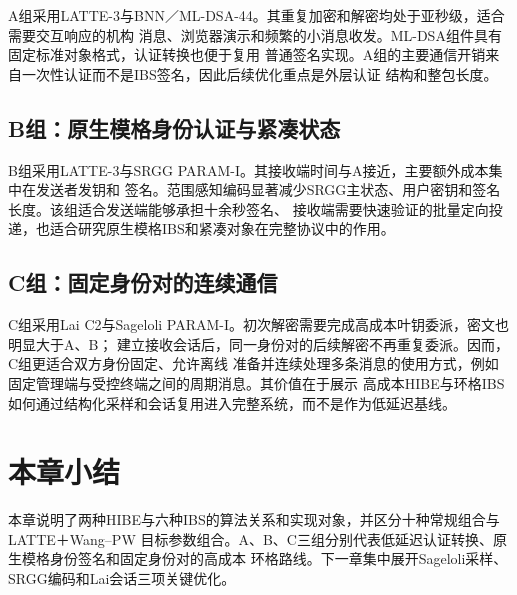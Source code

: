 A组采用LATTE-3与BNN／ML-DSA-44。其重复加密和解密均处于亚秒级，适合需要交互响应的机构
消息、浏览器演示和频繁的小消息收发。ML-DSA组件具有固定标准对象格式，认证转换也便于复用
普通签名实现。A组的主要通信开销来自一次性认证而不是IBS签名，因此后续优化重点是外层认证
结构和整包长度。

\subsection{B组：原生模格身份认证与紧凑状态}

B组采用LATTE-3与SRGG PARAM-I。其接收端时间与A接近，主要额外成本集中在发送者发钥和
签名。范围感知编码显著减少SRGG主状态、用户密钥和签名长度。该组适合发送端能够承担十余秒签名、
接收端需要快速验证的批量定向投递，也适合研究原生模格IBS和紧凑对象在完整协议中的作用。

\subsection{C组：固定身份对的连续通信}

C组采用Lai C2与Sageloli PARAM-I。初次解密需要完成高成本叶钥委派，密文也明显大于A、B；
建立接收会话后，同一身份对的后续解密不再重复委派。因而，C组更适合双方身份固定、允许离线
准备并连续处理多条消息的使用方式，例如固定管理端与受控终端之间的周期消息。其价值在于展示
高成本HIBE与环格IBS如何通过结构化采样和会话复用进入完整系统，而不是作为低延迟基线。

\section{本章小结}

本章说明了两种HIBE与六种IBS的算法关系和实现对象，并区分十种常规组合与LATTE＋Wang--PW
目标参数组合。A、B、C三组分别代表低延迟认证转换、原生模格身份签名和固定身份对的高成本
环格路线。下一章集中展开Sageloli采样、SRGG编码和Lai会话三项关键优化。

